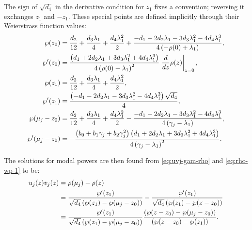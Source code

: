 \documentclass[11pt,a4paper]{article}
\numberwithin{equation}{section}
\begin{document}
The sign of $\sqrt{d_4}$ in the derivative condition for $z_1$ fixes a convention; reversing it exchanges $z_1$ and $-z_1$.
These special points are defined implicitly through their Weierstrass function values:
\begin{align}
\wp{\left(z_{0}\right)} &= \frac{{d}_{2}}{12} + \frac{{d}_{3} {\lambda}_{1}}{4} + \frac{{d}_{4} {\lambda}_{1}^{2}}{2} + \frac{- {d}_{1} - 2 {d}_{2} {\lambda}_{1} - 3 {d}_{3} {\lambda}_{1}^{2} - 4 {d}_{4} {\lambda}_{1}^{3}}{4 \left(- \rho{\left(0 \right)} + {\lambda}_{1}\right)}, \notag \\
\wp'{\left(z_{0}\right)} &= \frac{\left({d}_{1} + 2 {d}_{2} {\lambda}_{1} + 3 {d}_{3} {\lambda}_{1}^{2} + 4 {d}_{4} {\lambda}_{1}^{3}\right) }{4 \left(\rho{\left(0 \right)} - {\lambda}_{1}\right)^{2}}\left. \frac{d}{d z} \rho{\left(z \right)} \right|_{\substack{ z=0 }}, \notag \\
\wp{\left(z_{1}\right)} &= \frac{{d}_{2}}{12} + \frac{{d}_{3} {\lambda}_{1}}{4} + \frac{{d}_{4} {\lambda}_{1}^{2}}{2}, \notag \\
\wp'{\left(z_{1}\right)} &= \frac{\left(- {d}_{1} - 2 {d}_{2} {\lambda}_{1} - 3 {d}_{3} {\lambda}_{1}^{2} - 4 {d}_{4} {\lambda}_{1}^{3}\right) \sqrt{{d}_{4}}}{4}, \notag \\
\wp{\left({\mu}_{j} - z_{0}\right)} &= \frac{{d}_{2}}{12} + \frac{{d}_{3} {\lambda}_{1}}{4} + \frac{{d}_{4} {\lambda}_{1}^{2}}{2} - \frac{- {d}_{1} - 2 {d}_{2} {\lambda}_{1} - 3 {d}_{3} {\lambda}_{1}^{2} - 4 {d}_{4} {\lambda}_{1}^{3}}{4 \left({\gamma}_{j} - {\lambda}_{1}\right)}, \notag \\
\wp'{\left({\mu}_{j}- z_{0}\right)} &= - \frac{\left({b}_{0} + {b}_{1} {\gamma}_{j} + {b}_{2} {\gamma}_{j}^{2}\right) \left({d}_{1} + 2 {d}_{2} {\lambda}_{1} + 3 {d}_{3} {\lambda}_{1}^{2} + 4 {d}_{4} {\lambda}_{1}^{3}\right)}{4 \left({\gamma}_{j} - {\lambda}_{1}\right)^{2}}. \label{eq:wp-points}
\end{align}

The solutions for modal powers are then found from \eqref{eq:uvj-gam-rho} and \eqref{eq:rho-wp-1} to be:
\begin{align}
u_j{\left(z\right)} v_j{\left(z\right)} &= \rho(\mu_j) - \rho(z) \notag \\
&= \frac{\wp'{\left(z_{1}\right)}}{ \sqrt{{d}_{4}} \left(\wp{\left(z_{1}\right)} - \wp{\left({\mu}_{j} - z_{0}\right)}\right)} - \frac{\wp'{\left(z_{1}\right)}}{\sqrt{{d}_{4}} \left(\wp{\left(z_{1}\right)} - \wp{\left(z - z_{0}\right)}\right) } \notag \\
&= \frac{\wp'{\left(z_{1}\right)} }{ \sqrt{{d}_{4}} \left(\wp{\left(z_{1}\right)} - \wp{\left({\mu}_{j}- z_{0}\right)}\right)} \frac{ \left(\wp{\left(z - z_{0}\right)} - \wp{\left({\mu}_{j} - z_{0}\right)}\right) }{ \left(\wp{\left(z - z_{0}\right)} - \wp{\left(z_{1}\right)}\right) }. \label{eq:uv-wp}
\end{align}
\end{document}
